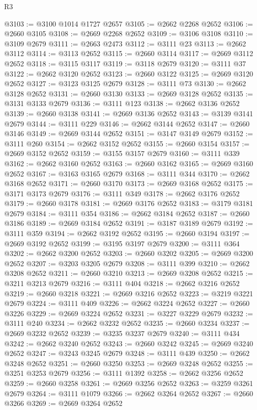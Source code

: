\begin{lexlean}{R3}
\begin{coremodule}
@3103 := @3100 @1014 @1727 @2657
@3105 := @2662 @2268 @2652
@3106 := @2660 @3105
@3108 := @2669 @2268 @2652
@3109 := @3106 @3108
@3110 := @3109 @2679
@3111 := @2663 @2473
@3112 := @3111 @23
@3113 := @2662 @3112
@3114 := @3113 @2652
@3115 := @2660 @3114
@3117 := @2669 @3112 @2652
@3118 := @3115 @3117
@3119 := @3118 @2679
@3120 := @3111 @37
@3122 := @2662 @3120 @2652
@3123 := @2660 @3122
@3125 := @2669 @3120 @2652
@3127 := @3123 @3125 @2679
@3128 := @3111 @73
@3130 := @2662 @3128 @2652
@3131 := @2660 @3130
@3133 := @2669 @3128 @2652
@3135 := @3131 @3133 @2679
@3136 := @3111 @123
@3138 := @2662 @3136 @2652
@3139 := @2660 @3138
@3141 := @2669 @3136 @2652
@3143 := @3139 @3141 @2679
@3144 := @3111 @229
@3146 := @2662 @3144 @2652
@3147 := @2660 @3146
@3149 := @2669 @3144 @2652
@3151 := @3147 @3149 @2679
@3152 := @3111 @260
@3154 := @2662 @3152 @2652
@3155 := @2660 @3154
@3157 := @2669 @3152 @2652
@3159 := @3155 @3157 @2679
@3160 := @3111 @339
@3162 := @2662 @3160 @2652
@3163 := @2660 @3162
@3165 := @2669 @3160 @2652
@3167 := @3163 @3165 @2679
@3168 := @3111 @344
@3170 := @2662 @3168 @2652
@3171 := @2660 @3170
@3173 := @2669 @3168 @2652
@3175 := @3171 @3173 @2679
@3176 := @3111 @349
@3178 := @2662 @3176 @2652
@3179 := @2660 @3178
@3181 := @2669 @3176 @2652
@3183 := @3179 @3181 @2679
@3184 := @3111 @354
@3186 := @2662 @3184 @2652
@3187 := @2660 @3186
@3189 := @2669 @3184 @2652
@3191 := @3187 @3189 @2679
@3192 := @3111 @359
@3194 := @2662 @3192 @2652
@3195 := @2660 @3194
@3197 := @2669 @3192 @2652
@3199 := @3195 @3197 @2679
@3200 := @3111 @364
@3202 := @2662 @3200 @2652
@3203 := @2660 @3202
@3205 := @2669 @3200 @2652
@3207 := @3203 @3205 @2679
@3208 := @3111 @399
@3210 := @2662 @3208 @2652
@3211 := @2660 @3210
@3213 := @2669 @3208 @2652
@3215 := @3211 @3213 @2679
@3216 := @3111 @404
@3218 := @2662 @3216 @2652
@3219 := @2660 @3218
@3221 := @2669 @3216 @2652
@3223 := @3219 @3221 @2679
@3224 := @3111 @409
@3226 := @2662 @3224 @2652
@3227 := @2660 @3226
@3229 := @2669 @3224 @2652
@3231 := @3227 @3229 @2679
@3232 := @3111 @240
@3234 := @2662 @3232 @2652
@3235 := @2660 @3234
@3237 := @2669 @3232 @2652
@3239 := @3235 @3237 @2679
@3240 := @3111 @434
@3242 := @2662 @3240 @2652
@3243 := @2660 @3242
@3245 := @2669 @3240 @2652
@3247 := @3243 @3245 @2679
@3248 := @3111 @439
@3250 := @2662 @3248 @2652
@3251 := @2660 @3250
@3253 := @2669 @3248 @2652
@3255 := @3251 @3253 @2679
@3256 := @3111 @1392
@3258 := @2662 @3256 @2652
@3259 := @2660 @3258
@3261 := @2669 @3256 @2652
@3263 := @3259 @3261 @2679
@3264 := @3111 @1079
@3266 := @2662 @3264 @2652
@3267 := @2660 @3266
@3269 := @2669 @3264 @2652

\end{coremodule}
\end{lexlean}
